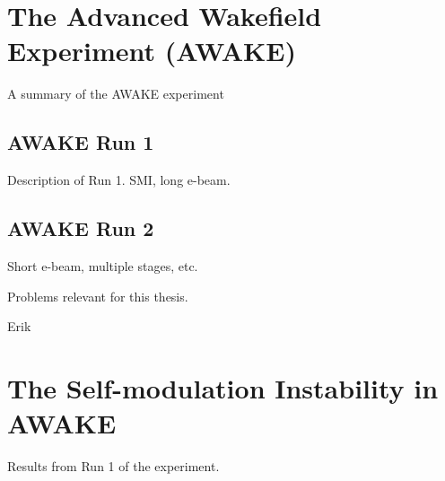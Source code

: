 \section{The Advanced Wakefield Experiment (AWAKE)}
\label{WFA:AWAKE}

A summary of the AWAKE experiment

\subsection{AWAKE Run 1}
\label{WFA:AWAKE:R1}

Description of Run 1. SMI, long e-beam.

\subsection{AWAKE Run 2}
\label{WFA:AWAKE:R2}

Short e-beam, multiple stages, etc.

Problems relevant for this thesis.

Erik \cite{adli:2016a}

\section{The Self-modulation Instability in AWAKE}
\label{WFA:SMI}

Results from Run 1 of the experiment.

